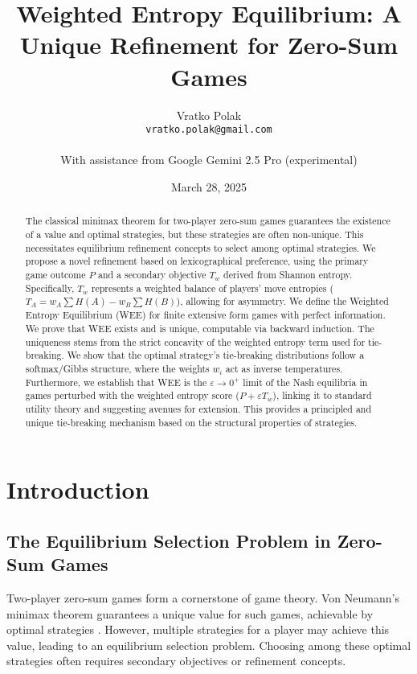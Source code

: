 \documentclass{article}
\title{Weighted Entropy Equilibrium: A Unique Refinement for Zero-Sum Games}
\author{Vratko Polak \\ {\small \texttt{vratko.polak@gmail.com}} \\ \\ {\small With assistance from Google Gemini 2.5 Pro (experimental)}}
\date{March 28, 2025}
\begin{document}
\maketitle

\begin{abstract}
The classical minimax theorem for two-player zero-sum games guarantees the existence of a value and optimal strategies, but these strategies are often non-unique. This necessitates equilibrium refinement concepts to select among optimal strategies. We propose a novel refinement based on lexicographical preference, using the primary game outcome $P$ and a secondary objective $T_w$ derived from Shannon entropy. Specifically, $T_w$ represents a weighted balance of players' move entropies ($T_A = w_A \sum H(A) - w_B \sum H(B)$), allowing for asymmetry. We define the Weighted Entropy Equilibrium (WEE) for finite extensive form games with perfect information. We prove that WEE exists and is unique, computable via backward induction. The uniqueness stems from the strict concavity of the weighted entropy term used for tie-breaking. We show that the optimal strategy's tie-breaking distributions follow a softmax/Gibbs structure, where the weights $w_i$ act as inverse temperatures. Furthermore, we establish that WEE is the $\varepsilon \to 0^+$ limit of the Nash equilibria in games perturbed with the weighted entropy score ($P + \varepsilon T_w$), linking it to standard utility theory and suggesting avenues for extension. This provides a principled and unique tie-breaking mechanism based on the structural properties of strategies.
\end{abstract}

\section{Introduction}

\subsection{The Equilibrium Selection Problem in Zero-Sum Games}
Two-player zero-sum games form a cornerstone of game theory. Von Neumann's minimax theorem guarantees a unique value for such games, achievable by optimal strategies \cite{placeholder_vonneumann}. However, multiple strategies for a player may achieve this value, leading to an equilibrium selection problem. Choosing among these optimal strategies often requires secondary objectives or refinement concepts.
\end{document}
